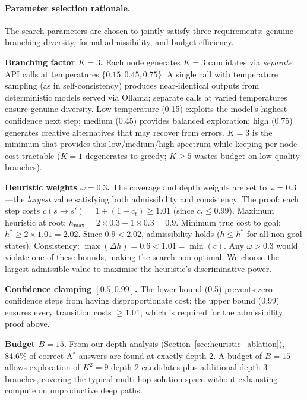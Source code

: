 \documentclass{article}
\newcommand{\astar}{A$^*$\xspace}
\begin{document}
\paragraph{Parameter selection rationale.}
The search parameters are chosen to jointly satisfy three requirements: genuine branching diversity, formal admissibility, and budget efficiency.

\textbf{Branching factor $K=3$.} Each node generates $K=3$ candidates via \emph{separate} API calls at temperatures $\{0.15, 0.45, 0.75\}$. A single call with temperature sampling (as in self-consistency) produces near-identical outputs from deterministic models served via Ollama; separate calls at varied temperatures ensure genuine diversity. Low temperature (0.15) exploits the model's highest-confidence next step; medium (0.45) provides balanced exploration; high (0.75) generates creative alternatives that may recover from errors. $K=3$ is the minimum that provides this low/medium/high spectrum while keeping per-node cost tractable ($K=1$ degenerates to greedy; $K \geq 5$ wastes budget on low-quality branches).

\textbf{Heuristic weights $\omega = 0.3$.} The coverage and depth weights are set to $\omega = 0.3$---the \emph{largest} value satisfying both admissibility and consistency. The proof: each step costs $c(s \to s') = 1 + (1 - c_t) \geq 1.01$ (since $c_t \leq 0.99$). Maximum heuristic at root: $h_{\max} = 2 \times 0.3 + 1 \times 0.3 = 0.9$. Minimum true cost to goal: $h^* \geq 2 \times 1.01 = 2.02$. Since $0.9 < 2.02$, admissibility holds ($h \leq h^*$ for all non-goal states). Consistency: $\max(\Delta h) = 0.6 < 1.01 = \min(c)$. Any $\omega > 0.3$ would violate one of these bounds, making the search non-optimal. We choose the largest admissible value to maximise the heuristic's discriminative power.

\textbf{Confidence clamping $[0.5, 0.99]$.} The lower bound (0.5) prevents zero-confidence steps from having disproportionate cost; the upper bound (0.99) ensures every transition costs $\geq 1.01$, which is required for the admissibility proof above.

\textbf{Budget $B=15$.} From our depth analysis (Section~\ref{sec:heuristic_ablation}), 84.6\% of correct \astar answers are found at exactly depth 2. A budget of $B=15$ allows exploration of $K^2 = 9$ depth-2 candidates plus additional depth-3 branches, covering the typical multi-hop solution space without exhausting compute on unproductive deep paths.
\end{document}
